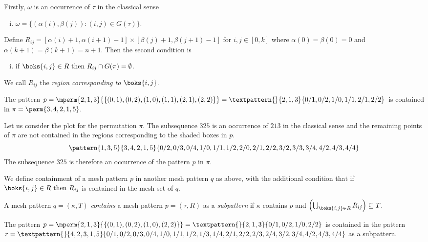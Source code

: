 \noindent Firstly, \(\omega\) is an occurrence of \(\tau\) in the classical sense
  \begin{enumerate}[i.]
    \item \(\omega = \{(\alpha(i),\beta(j)):(i,j)\in G(\tau)\}\).
  \end{enumerate}\saveenum
  Define \(R_{ij} = [\alpha(i)+1,\alpha(i+1)-1]\times[\beta(j)+1,\beta(j+1)-1]\)
   for \(i,j\in[0,k]\) where \(\alpha(0)=\beta(0)=0\) and \(\alpha(k+1)=\beta(k+1)=n+1\). Then
   the second condition is
  \begin{enumerate}[i.]\resetenum
  \item if \(\boks{i,j} \in R \text{ then } R_{ij} \cap G(\pi) = \emptyset\).
\end{enumerate}
We call \(R_{ij}\) the \emph{region corresponding to} \(\boks{i,j}\).

\begin{example}
    The pattern \(p=\mperm{2,1,3}{\{(0,1),(0,2),(1,0),(1,1),(2,1),(2,2)\}}=
    \textpattern{}{ 2, 1, 3 }{ 0/1, 0/2, 1/0, 1/1, 2/1, 2/2 }\) is contained in
    \(\pi = \perm{3,4,2,1,5}\).
\end{example}

Let us consider the plot for the permutation \(\pi\). The subsequence \(325\) is
an occurrence of \(213\) in the classical sense and the remaining points of \(\pi\)
are not contained in the regions corresponding to the shaded boxes in \(p\).
\begin{equation*}
    \pattern{1,3,5}{3,4,2,1,5}{0/2,0/3,0/4,
                               1/0,1/1,1/2,
                               2/0,2/1,2/2,
                               3/2,3/3,3/4,
                               4/2,4/3,4/4}
\end{equation*}
The subsequence \(325\) is therefore an occurrence of the pattern \(p\) in \(\pi\).

We define containment of a mesh pattern \(p\) in another mesh pattern \(q\) as above,
with the additional condition that if \(\boks{i,j}\in R\text{ then } R_{ij}\) is
contained in the mesh set of \(q\).

\begin{definition}
A mesh pattern \(q=(\kappa,T)\) \emph{contains} a mesh pattern \(p=(\tau,R)\) as a \emph{subpattern}
if \(\kappa\) contains \(p\) and \(\left(\bigcup_{\boks{i,j}\in R} R_{ij}\right)\subseteq T\).
\end{definition}

\begin{example}
    The pattern \(p=\mperm{2,1,3}{\{(0,1),(0,2),(1,0),(2,2)\}}=
    \textpattern{}{ 2, 1, 3 }{ 0/1, 0/2, 1/0, 2/2 }\) is contained in the pattern
    \(r = \textpattern{}{4,2,3,1,5}{0/1,0/2,0/3,0/4,
                               1/0,1/1,1/2,1/3,1/4,
                               2/1,2/2,2/3,2/4,
                               3/2,3/4,
                               4/2,4/3,4/4} \) as a subpattern.
\end{example}

